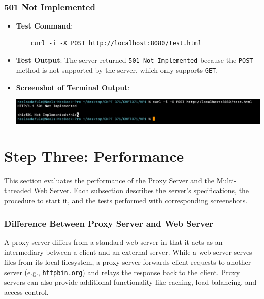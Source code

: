 \documentclass{article}
\begin{document}
\subsubsection*{501 Not Implemented}
\begin{itemize}
    \item \textbf{Test Command}:
    \begin{lstlisting}
    curl -i -X POST http://localhost:8080/test.html
    \end{lstlisting}

    \item \textbf{Test Output}: The server returned \texttt{501 Not Implemented} because the \texttt{POST} method is not supported by the server, which only supports \texttt{GET}.

    \item \textbf{Screenshot of Terminal Output}:
    \begin{center}
        \includegraphics[width=\textwidth]{screenshots/501_Not_Implemented.png}  %
    \end{center}
\end{itemize}

\section*{Step Three: Performance}

This section evaluates the performance of the Proxy Server and the Multi-threaded Web Server. Each subsection describes the server's specifications, the procedure to start it, and the tests performed with corresponding screenshots.

\subsubsection*{Difference Between Proxy Server and Web Server}

A proxy server differs from a standard web server in that it acts as an intermediary between a client and an external server. While a web server serves files from its local filesystem, a proxy server forwards client requests to another server (e.g., \texttt{httpbin.org}) and relays the response back to the client. Proxy servers can also provide additional functionality like caching, load balancing, and access control.
\end{document}
